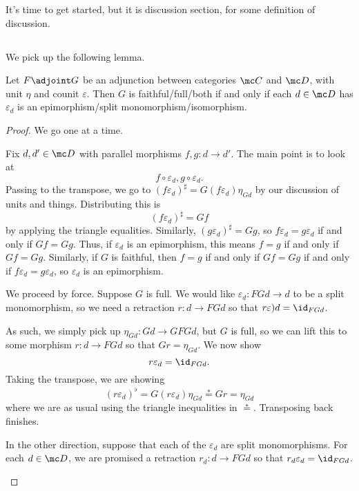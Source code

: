 
It's time to get started, but it is discussion section, for some definition of discussion.

\subsection{}
We pick up the following lemma.
\begin{lemma}
	Let $F\adjoint G$ be an adjunction between categories $\mc C$ and $\mc D$, with unit $\eta$ and counit $\varepsilon$. Then $G$ is faithful/full/both if and only if each $d\in\mc D$ has $\varepsilon_d$ is an epimorphism/split monomorphism/isomorphism.
\end{lemma}
\begin{proof}
	We go one at a time.
	\begin{listroman}
		\item Fix $d,d'\in\mc D$ with parallel morphisms $f,g\colon d\to d'$. The main point is to look at
		\[f\circ\varepsilon_d,g\circ\varepsilon_d.\]
		Passing to the transpose, we go to $(f\varepsilon_d)^\sharp=G(f\varepsilon_d)\eta_{Gd}$ by our discussion of units and things. Distributing this is
		\[(f\varepsilon_d)^\sharp=Gf\]
		by applying the triangle equalities. Similarly, $(g\varepsilon_d)^\sharp=Gg$, so $f\varepsilon_d=g\varepsilon_d$ if and only if $Gf=Gg$. Thus, if $\varepsilon_d$ is an epimorphism, this means $f=g$ if and only if $Gf=Gg$. Similarly, if $G$ is faithful, then $f=g$ if and only if $Gf=Gg$ if and only if $f\varepsilon_d=g\varepsilon_d$, so $\varepsilon_d$ is an epimorphism.
		\item We proceed by force. Suppose $G$ is full. We would like $\varepsilon_d\colon FGd\to d$ to be a split monomorphism, so we need a retraction $r\colon d\to FGd$ so that $r\varepsilon)d=\id_{FGd}$.

		As such, we simply pick up $\eta_{Gd}\colon Gd\to GFGd$, but $G$ is full, so we can lift this to some morphism $r\colon d\to FGd$ so that $Gr=\eta_{Gd}$. We now show
		\[r\varepsilon_d=\id_{FGd}.\]
		Taking the transpose, we are showing
		\[(r\varepsilon_d)^\flat=G(r\varepsilon_d)\eta_{Gd}\stackrel*=Gr=\eta_{Gd}\]
		where we are as usual using the triangle inequalities in $\stackrel*=$. Transposing back finishes.

		In the other direction, suppose that each of the $\varepsilon_d$ are split monomorphisms. For each $d\in\mc D$, we are promised a retraction $r_d\colon d\to FGd$ so that $r_d\varepsilon_d=\id_{FGd}$.


\end{listroman}
\end{proof}
